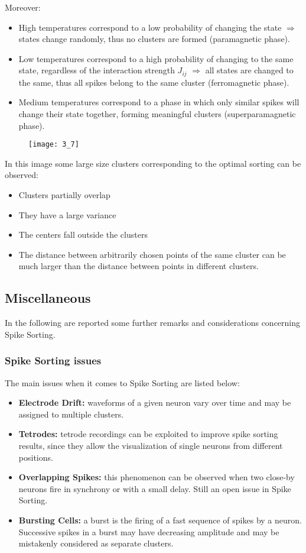 \begin{itemize}
    Moreover:
    \begin{itemize}
        \item High temperatures correspond to a low probability of changing the state \(\Rightarrow\) states change randomly, thus no clusters are formed (paramagnetic phase).
        \item Low temperatures correspond to a high probability of changing to the same state, regardless of the interaction strength \(J_{ij}\) \(\Rightarrow\) all states are changed to the same, thus all spikes belong to the same cluster (ferromagnetic phase).
        \item Medium temperatures correspond to a phase in which only similar spikes will change their state together, forming meaningful clusters (superparamagnetic phase).
    \end{itemize}
\end{itemize}
\begin{figure}[H]
    \texttt{[image: 3\_7]}
    \centering
\end{figure}
In this image some large size clusters corresponding to the optimal sorting can be observed:
\begin{itemize}
    \item Clusters partially overlap
    \item They have a large variance
    \item The centers fall outside the clusters
    \item The distance between arbitrarily chosen points of the same cluster can be much larger than the distance between points in different clusters. 
\end{itemize}

\subsection{Miscellaneous}
In the following are reported some further remarks and considerations concerning Spike Sorting.
\subsubsection{Spike Sorting issues}
The main issues when it comes to Spike Sorting are listed below:
\begin{itemize}
    \item \textbf{Electrode Drift:} waveforms of a given neuron vary over
          time and may be assigned to multiple clusters.
    \item \textbf{Tetrodes:} tetrode recordings can be exploited to improve
          spike sorting results, since they allow the visualization of single
          neurons from different positions.
    \item \textbf{Overlapping Spikes:} this phenomenon can be observed when
          two close-by neurons fire in synchrony or with a small delay. Still
          an open issue in Spike Sorting.
    \item \textbf{Bursting Cells:} a burst is the firing of a fast sequence
          of spikes by a neuron. Successive spikes in a burst may have decreasing
          amplitude and may be mistakenly considered as separate clusters.
\end{itemize}
